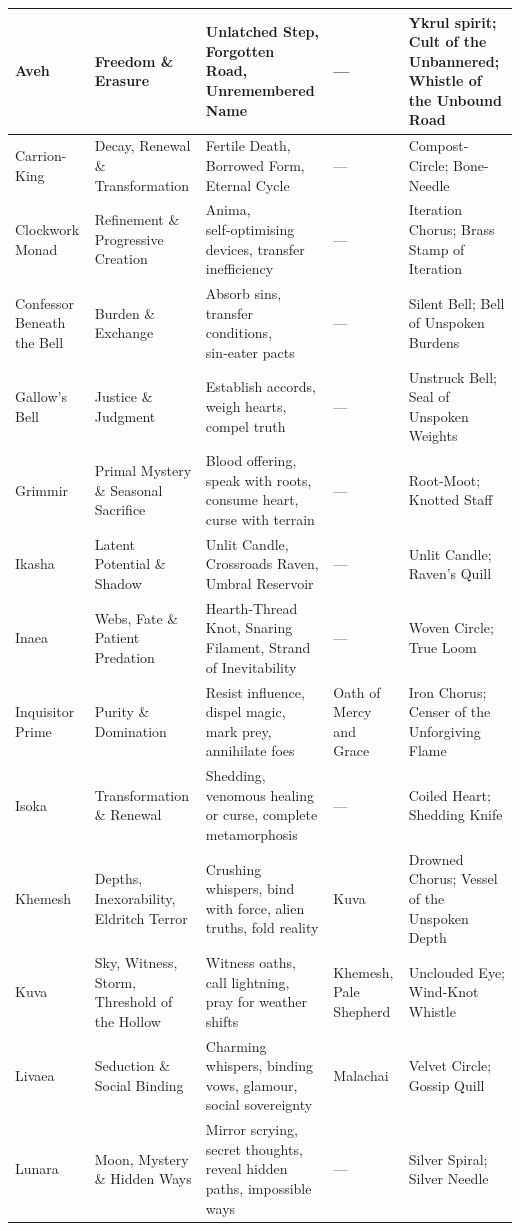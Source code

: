 \begin{center}
\begin{longtable}{p{2.2cm}p{2.5cm}p{3.5cm}p{1.6cm}p{3.2cm}}
Aveh & Freedom \& Erasure & Unlatched Step, Forgotten Road, Unremembered Name & --- & Ykrul spirit; Cult of the Unbannered; Whistle of the Unbound Road \\
\hline
Carrion-King & Decay, Renewal \& Transformation & Fertile Death, Borrowed Form, Eternal Cycle & --- & Compost-Circle; Bone-Needle \\
\hline
Clockwork Monad & Refinement \& Progressive Creation & Anima, self‑optimising devices, transfer inefficiency & --- & Iteration Chorus; Brass Stamp of Iteration \\
\hline
Confessor Beneath the Bell & Burden \& Exchange & Absorb sins, transfer conditions, sin‑eater pacts & --- & Silent Bell; Bell of Unspoken Burdens \\
\hline
Gallow's Bell & Justice \& Judgment & Establish accords, weigh hearts, compel truth & --- & Unstruck Bell; Seal of Unspoken Weights \\
\hline
Grimmir & Primal Mystery \& Seasonal Sacrifice & Blood offering, speak with roots, consume heart, curse with terrain & --- & Root-Moot; Knotted Staff \\
\hline
Ikasha & Latent Potential \& Shadow & Unlit Candle, Crossroads Raven, Umbral Reservoir & --- & Unlit Candle; Raven's Quill \\
\hline
Inaea & Webs, Fate \& Patient Predation & Hearth‑Thread Knot, Snaring Filament, Strand of Inevitability & --- & Woven Circle; True Loom \\
\hline
Inquisitor Prime & Purity \& Domination & Resist influence, dispel magic, mark prey, annihilate foes & Oath of Mercy and Grace & Iron Chorus; Censer of the Unforgiving Flame \\
\hline
Isoka & Transformation \& Renewal & Shedding, venomous healing or curse, complete metamorphosis & --- & Coiled Heart; Shedding Knife \\
\hline
Khemesh & Depths, Inexorability, Eldritch Terror & Crushing whispers, bind with force, alien truths, fold reality & Kuva & Drowned Chorus; Vessel of the Unspoken Depth \\
\hline
Kuva & Sky, Witness, Storm, Threshold of the Hollow & Witness oaths, call lightning, pray for weather shifts & Khemesh, Pale Shepherd & Unclouded Eye; Wind‑Knot Whistle \\
\hline
Livaea & Seduction \& Social Binding & Charming whispers, binding vows, glamour, social sovereignty & Malachai & Velvet Circle; Gossip Quill \\
\hline
Lunara & Moon, Mystery \& Hidden Ways & Mirror scrying, secret thoughts, reveal hidden paths, impossible ways & --- & Silver Spiral; Silver Needle \\

\end{longtable}
\end{center}
